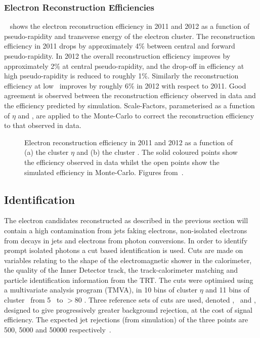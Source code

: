 \subsubsection{Electron Reconstruction Efficiencies}

~ shows the electron reconstruction efficiency in 2011 and 2012
as a function of pseudo-rapidity and transverse energy of the electron cluster.
The reconstruction efficiency in 2011 drops by approximately 4\% between central
and forward pseudo-rapidity. In 2012 the overall reconstruction efficiency
improves by approximately 2\% at central pseudo-rapidity, and the drop-off in
efficiency at high pseudo-rapidity is reduced to roughly 1\%. Similarly the
reconstruction efficiency at low \et\ improves by roughly 6\% in 2012 with
respect to 2011. Good agreement is observed between the reconstruction
efficiency observed in data and the efficiency predicted by simulation.
Scale-Factors, parameterised as a function of $\eta$ and \et, are applied to
the Monte-Carlo to correct the reconstruction efficiency to that observed in
data.

\begin{figure}[h]
\centering
\caption{Electron reconstruction efficiency in 2011 and 2012 as a function of (a) the cluster
$\eta$ and (b) the cluster \et. The solid coloured points show the efficiency
observed in data whilst the open points show the simulated efficiency in
Monte-Carlo. Figures from~\cite{ElectronEfficiency2012}.}
\label{fig:el-reco-eff}
\end{figure}

\subsection{Identification}
\label{sec:reco-el-id}

The electron candidates reconstructed as described in the previous section will
contain a high contamination from jets faking electrons, non-isolated electrons
from decays in jets and electrons from photon conversions. In order to identify prompt isolated photons a
cut based identification is used. Cuts are made on variables relating to the
shape of the electromagnetic shower in the calorimeter, the quality of the Inner Detector track, the
track-calorimeter matching and particle identification information from the
TRT. The cuts were optimised using a multivariate analysis program (TMVA), in 10 bins
of cluster $\eta$ and 11 bins of cluster \et\ from 5 \gev\ to $>80$ \gev.
Three reference sets of cuts are used, denoted \loose, \medium\ and \tight,
designed to give progressively greater background rejection, at the cost of
signal efficiency. The expected jet rejections (from simulation) of the three points are 500, 5000
and 50000 respectively~\cite{ATL-PHYS-PUB-2011-006}.

